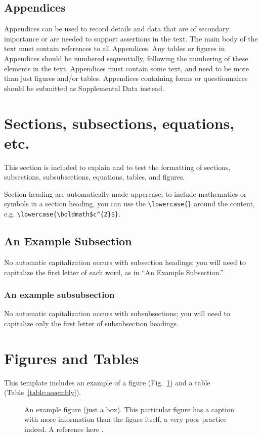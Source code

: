 \documentclass[Journal,letterpaper]{ascelike-new}
\begin{document}
\subsection{Appendices}

Appendices can be used to record details and data that are of secondary importance or are needed to support assertions in the text. The main body of the text must contain references to all Appendices. Any tables or figures in Appendices should be numbered sequentially, following the numbering of these elements in the text. Appendices must contain some text, and need to be more than just figures and/or tables. Appendices containing forms or questionnaires should be submitted as Supplemental Data instead.


\section{Sections, subsections, equations, etc.}

This section is included to explain and to test the formatting of sections, subsections, subsubsections, equations, tables, and figures. 

Section heading are automatically made uppercase; to include mathematics or symbols in a section heading, you can use the \verb+\lowercase{}+ around the content, e.g. \verb+\lowercase{\boldmath$c^{2}$}+.

\subsection{An Example Subsection}
No automatic capitalization occurs with subsection headings; you will need to capitalize the first letter of each word, as in ``An Example Subsection.''

\subsubsection{An example subsubsection}
No automatic capitalization occurs with subsubsections; you will need to capitalize only the first letter of subsubsection headings.

\section{Figures and Tables}

This template includes an example of a figure (Fig.~\ref{fig:box_fig}) and a table (Table~\ref{table:assembly}).

\begin{figure}
\centering
\framebox[3.00in]{\rule[0in]{0in}{1.00in}}
\caption{An example figure (just a box).  
This particular figure has a caption with more information 
than the figure itself, a very poor practice indeed.
A reference here \protect\cite{Stahl:2004a}.}
\label{fig:box_fig}
\end{figure}
\end{document}
